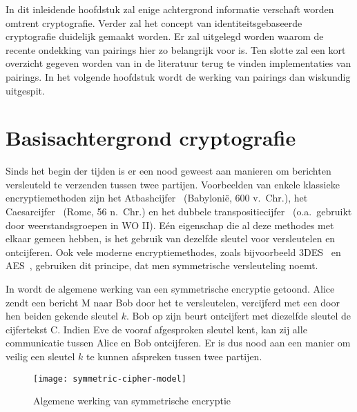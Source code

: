 
 In dit inleidende hoofdstuk zal enige achtergrond informatie verschaft worden omtrent cryptografie. Verder zal het concept van identiteitsgebaseerde cryptografie duidelijk gemaakt worden. Er zal uitgelegd worden waarom de recente ondekking van pairings hier zo belangrijk voor is. Ten slotte zal een kort overzicht gegeven worden van in de literatuur terug te vinden implementaties van pairings. In het volgende hoofdstuk wordt de werking van pairings dan wiskundig uitgespit.

\section{Basisachtergrond cryptografie}

Sinds het begin der tijden is er een nood geweest aan manieren om berichten versleuteld te verzenden tussen twee partijen. Voorbeelden van enkele klassieke encryptiemethoden zijn het Atbashcijfer~\cite{athbash} (Babyloni\"e, 600 v.\ Chr.), het Caesarcijfer~\cite{caesar} (Rome, 56 n.\ Chr.) en het dubbele transpositiecijfer~\cite{kahn} (o.a.\ gebruikt door weerstandsgroepen in WO II). E\'en eigenschap die al deze methodes met elkaar gemeen hebben, is het gebruik van dezelfde sleutel voor versleutelen en ontcijferen. Ook vele moderne encryptiemethodes, zoals bijvoorbeeld 3DES~\cite{3des} en AES~\cite{aes}, gebruiken dit principe, dat men symmetrische versleuteling noemt.

In  wordt de algemene werking van een symmetrische encryptie getoond. Alice zendt een bericht M naar Bob door het te versleutelen, vercijferd met een door hen beiden gekende sleutel $k$. Bob op zijn beurt ontcijfert met diezelfde sleutel de cijfertekst C. Indien Eve de vooraf afgesproken sleutel kent, kan zij alle communicatie tussen Alice en Bob ontcijferen. Er is dus nood aan een manier om veilig een sleutel $k$ te kunnen afspreken tussen twee partijen.

\begin{figure}[h]
	\centering
		\texttt{[image: symmetric-cipher-model]}
		\caption{Algemene werking van symmetrische encryptie\label{fig-encryptie-applicaties-sym-cipher}}
\end{figure}

